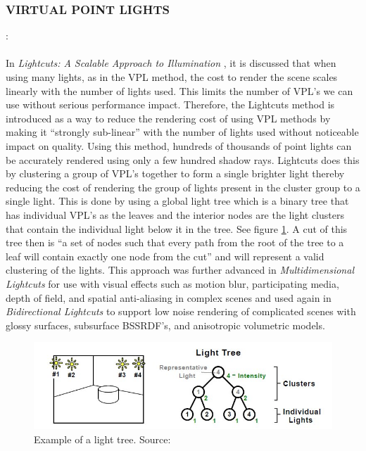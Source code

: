 \subsubsection{VIRTUAL POINT LIGHTS}: 
\paragraph{}
In \textit{Lightcuts: A Scalable Approach to Illumination} \cite{Walter2005}, it is discussed that when using many lights, as in the VPL method, the cost to render the scene scales linearly with the number of lights used.  This limits the number of VPL's we can use without serious performance impact.  Therefore, the Lightcuts method is introduced as a way to reduce the rendering cost of using VPL methods by making it “strongly sub-linear” with the number of lights used without noticeable impact on quality.  Using this method, hundreds of thousands of point lights can be accurately rendered using only a few hundred shadow rays.  Lightcuts does this by clustering a group of VPL's together to form a single brighter light thereby reducing the cost of rendering the group of lights present in the cluster group to a single light.  This is done by using a global light tree which is a binary tree that has individual VPL's as the leaves and the interior nodes are the light clusters that contain the individual light below it in the tree.  See figure \ref{fig:lightTree}.  A cut of this tree then is ``a set of nodes such that every path from the root of the tree to a leaf will contain exactly one node from the cut'' and will represent a valid clustering of the lights.  This approach was further advanced in \textit{Multidimensional Lightcuts} \cite{Walter2006} for use with visual effects such as motion blur, participating media, depth of field, and spatial anti-aliasing in complex scenes and used again in \textit{Bidirectional Lightcuts} \cite{Walter2012} to support low noise rendering of complicated scenes with glossy surfaces, subsurface BSSRDF's, and anisotropic volumetric models.

\begin{figure}[h!]
  \centering
    \includegraphics[width=1.0\textwidth]{lightTree.jpg}
  \caption{Example of a light tree. Source: \protect\cite{Walter2005}}
	\label{fig:lightTree}
\end{figure}

